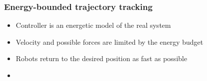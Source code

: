 \documentclass[student]{ITRslides}
\begin{document}
\begin{frame}
	\frametitle{Energy-bounded trajectory tracking}
	\begin{figure}
		
	\end{figure}
	\begin{itemize}
		\item Controller is an energetic model of the real system
		\item Velocity and possible forces are limited by the energy budget
		\item Robots return to the desired position as fast as possible
		\item 
	\end{itemize}
	 
	
	
\end{frame}

%
\end{document}
